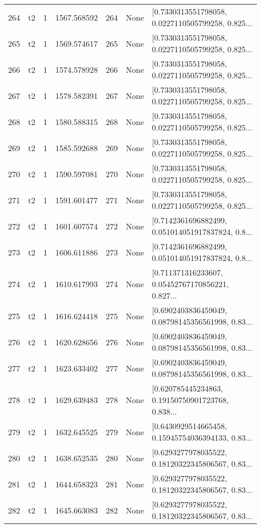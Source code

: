 \begin{tabular}{lllrlll}
264 &  t2 &   1 &  1567.568592 &  264 &  None &  [0.7330313551798058, 0.0227110505799258, 0.825... \\
265 &  t2 &   1 &  1569.574617 &  265 &  None &  [0.7330313551798058, 0.0227110505799258, 0.825... \\
266 &  t2 &   1 &  1574.578928 &  266 &  None &  [0.7330313551798058, 0.0227110505799258, 0.825... \\
267 &  t2 &   1 &  1578.582391 &  267 &  None &  [0.7330313551798058, 0.0227110505799258, 0.825... \\
268 &  t2 &   1 &  1580.588315 &  268 &  None &  [0.7330313551798058, 0.0227110505799258, 0.825... \\
269 &  t2 &   1 &  1585.592688 &  269 &  None &  [0.7330313551798058, 0.0227110505799258, 0.825... \\
270 &  t2 &   1 &  1590.597081 &  270 &  None &  [0.7330313551798058, 0.0227110505799258, 0.825... \\
271 &  t2 &   1 &  1591.601477 &  271 &  None &  [0.7330313551798058, 0.0227110505799258, 0.825... \\
272 &  t2 &   1 &  1601.607574 &  272 &  None &  [0.7142361696882499, 0.051014051917837824, 0.8... \\
273 &  t2 &   1 &  1606.611886 &  273 &  None &  [0.7142361696882499, 0.051014051917837824, 0.8... \\
274 &  t2 &   1 &  1610.617993 &  274 &  None &  [0.711371316233607, 0.05452767170856221, 0.827... \\
275 &  t2 &   1 &  1616.624418 &  275 &  None &  [0.6902403836459049, 0.08798145356561998, 0.83... \\
276 &  t2 &   1 &  1620.628656 &  276 &  None &  [0.6902403836459049, 0.08798145356561998, 0.83... \\
277 &  t2 &   1 &  1623.633402 &  277 &  None &  [0.6902403836459049, 0.08798145356561998, 0.83... \\
278 &  t2 &   1 &  1629.639483 &  278 &  None &  [0.620785445234863, 0.19150750901723768, 0.838... \\
279 &  t2 &   1 &  1632.645525 &  279 &  None &  [0.6430929514665458, 0.15945754036394133, 0.83... \\
280 &  t2 &   1 &  1638.652535 &  280 &  None &  [0.6293277978035522, 0.18120322345806567, 0.83... \\
281 &  t2 &   1 &  1644.658323 &  281 &  None &  [0.6293277978035522, 0.18120322345806567, 0.83... \\
282 &  t2 &   1 &  1645.663083 &  282 &  None &  [0.6293277978035522, 0.18120322345806567, 0.83... \\

\end{tabular}
